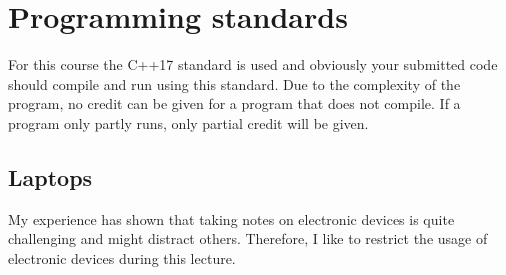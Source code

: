 \documentclass[11pt,letterpaper]{article}
\begin{document}
\section*{Programming standards}

For this course the C++17 standard is used and obviously your submitted code should compile and run using this standard. Due to the complexity of the program, no credit can be given for a program that does not compile. If a program only partly runs, only partial credit will be given.

\subsection*{Laptops}

My experience has shown that taking notes on electronic devices is quite challenging and might distract others. Therefore, I like to restrict the usage of electronic devices during this lecture. 
\end{document}
